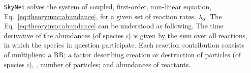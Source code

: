 \texttt{SkyNet} solves the system of coupled, first-order, non-linear equation, 
Eq.~\eqref{eq:theory:nuc:abundance}, for a given set of reaction rates, $\lambda_{\alpha}$. 
The Eq.~\eqref{eq:theory:nuc:abundance} can be understood as following. 
The time derivative of the abundances (of species $i$) is given by the sum over all reactions, 
in which the species in question participate. Each reaction contribution consists of multipliers: 
a \ac{RR}; a factor describing creation or destruction of particles (of species $i$), 
\ie, number of particles; and abundances of reactants. 
%
%
%
%
